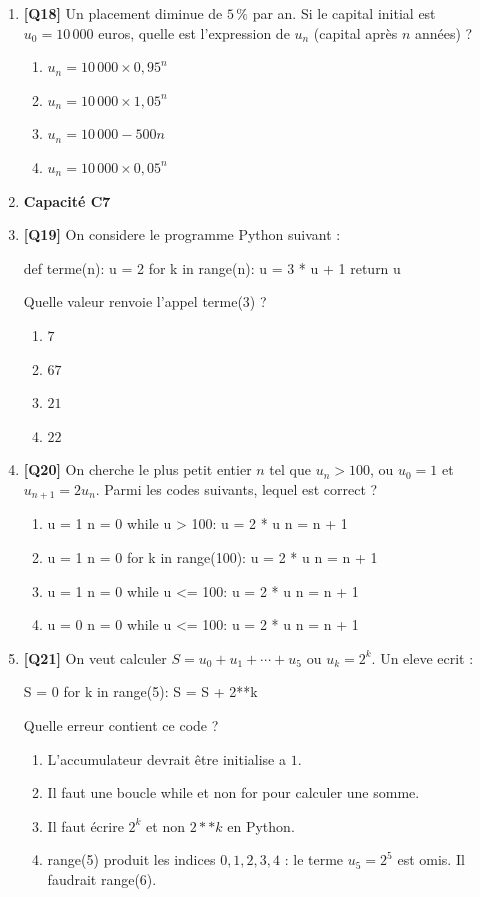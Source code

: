 \begin{enumerate}
\item \textbf{[Q18]} Un placement diminue de $5\,\%$ par an. Si le capital initial est $u_0 = 10\,000$ euros, quelle est l'expression de $u_n$ (capital après $n$ années) ?
  \begin{enumerate}[label=\Alph*.]
    \item $u_n = 10\,000 \times 0{,}95^n$
    \item $u_n = 10\,000 \times 1{,}05^n$
    \item $u_n = 10\,000 - 500n$
    \item $u_n = 10\,000 \times 0{,}05^n$
  \end{enumerate}

\item[] \textbf{Capacité C7}

\item \textbf{[Q19]} On considere le programme Python suivant :

def terme(n):
    u = 2
    for k in range(n):
        u = 3 * u + 1
    return u

Quelle valeur renvoie l'appel terme(3) ?
  \begin{enumerate}[label=\Alph*.]
    \item $7$
    \item $67$
    \item $21$
    \item $22$
  \end{enumerate}

\item \textbf{[Q20]} On cherche le plus petit entier $n$ tel que $u_n > 100$, ou $u_0 = 1$ et $u_{n+1} = 2u_n$. Parmi les codes suivants, lequel est correct ?
  \begin{enumerate}[label=\Alph*.]
    \item u = 1
n = 0
while u > 100:
    u = 2 * u
    n = n + 1
    \item u = 1
n = 0
for k in range(100):
    u = 2 * u
    n = n + 1
    \item u = 1
n = 0
while u <= 100:
    u = 2 * u
    n = n + 1
    \item u = 0
n = 0
while u <= 100:
    u = 2 * u
    n = n + 1
  \end{enumerate}

\item \textbf{[Q21]} On veut calculer $S = u_0 + u_1 + \cdots + u_5$ ou $u_k = 2^k$. Un eleve ecrit :

S = 0
for k in range(5):
    S = S + 2**k

Quelle erreur contient ce code ?
  \begin{enumerate}[label=\Alph*.]
    \item L'accumulateur devrait être initialise a $1$.
    \item Il faut une boucle while et non for pour calculer une somme.
    \item Il faut écrire $2^k$ et non $2**k$ en Python.
    \item range(5) produit les indices $0, 1, 2, 3, 4$ : le terme $u_5 = 2^5$ est omis. Il faudrait range(6).
  \end{enumerate}

\end{enumerate}

